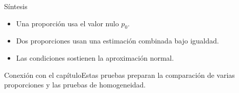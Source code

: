 \documentclass[10pt,aspectratio=169]{beamer}
\begin{document}
\begin{frame}{Síntesis}\small\begin{itemize}\item Una proporción usa el valor nulo $p_0$.\item Dos proporciones usan una estimación combinada bajo igualdad.\item Las condiciones sostienen la aproximación normal.\end{itemize}\end{frame}
\begin{frame}{Conexión con el capítulo}\small Estas pruebas preparan la comparación de varias proporciones y las pruebas de homogeneidad.\end{frame}
\end{document}
